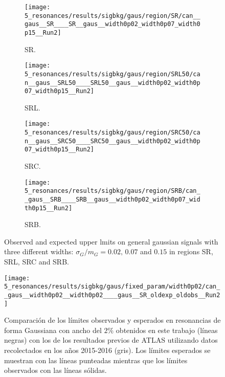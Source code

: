 \begin{figure}[ht!]
    \centering
    \begin{subfigure}[h]{0.49\linewidth}
        \centering
        \texttt{[image: 5\_resonances/results/sigbkg/gaus/region/SR/can\_\_gaus\_\_SR\_\_\_\_SR\_\_gaus\_\_width0p02\_width0p07\_width0p15\_\_Run2]}
        \caption{SR.}
    \end{subfigure}
    \begin{subfigure}[h]{0.49\linewidth}
        \centering
        \texttt{[image: 5\_resonances/results/sigbkg/gaus/region/SRL50/can\_\_gaus\_\_SRL50\_\_\_\_SRL50\_\_gaus\_\_width0p02\_width0p07\_width0p15\_\_Run2]}
        \caption{SRL.}
    \end{subfigure}
    \begin{subfigure}[h]{0.49\linewidth}
        \centering
        \texttt{[image: 5\_resonances/results/sigbkg/gaus/region/SRC50/can\_\_gaus\_\_SRC50\_\_\_\_SRC50\_\_gaus\_\_width0p02\_width0p07\_width0p15\_\_Run2]}
        \caption{SRC.}
    \end{subfigure}
    \begin{subfigure}[h]{0.49\linewidth}
        \centering
        \texttt{[image: 5\_resonances/results/sigbkg/gaus/region/SRB/can\_\_gaus\_\_SRB\_\_\_\_SRB\_\_gaus\_\_width0p02\_width0p07\_width0p15\_\_Run2]}
        \caption{SRB.}
    \end{subfigure}
    \caption{Observed and expected upper lmits on general gaussian signals with three different widths: \(\sigma_G/m_G = 0.02, \, 0.07\) and \(0.15\) in regions SR, SRL, SRC and SRB.}
    \label{fig:results:results:bkgsig:results:gaus:limits}
\end{figure}

\begin{figure}[ht!]
    \centering
    \texttt{[image: 5\_resonances/results/sigbkg/gaus/fixed\_param/width0p02/can\_\_gaus\_\_width0p02\_\_width0p02\_\_\_\_gaus\_\_SR\_oldexp\_oldobs\_\_Run2]}
    \caption{Comparación de los límites observados y esperados en resonancias de forma Gaussiana con ancho del \(2\%\) obtenidos en este trabajo (líneas negras) con los de los resultados previos de \ac{ATLAS} utilizando datos recolectados en los años 2015-2016 (gris). Los límites esperados se muestran con las líneas punteadas mientras que los límites observados con las líneas sólidas.}
    \label{fig:results:results:bkgsig:results:gaus:limits_comparison_old}
\end{figure}


